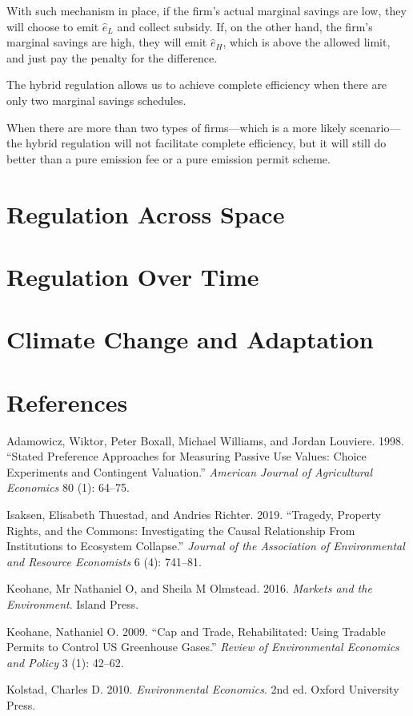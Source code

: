 \documentclass[
]{book}
\begin{document}
With such mechanism in place, if the firm's actual marginal savings are low, they will choose to emit \(\hat{e}_L\) and collect subsidy. If, on the other hand, the firm's marginal savings are high, they will emit \(\hat{e}_H\), which is above the allowed limit, and just pay the penalty for the difference.

The hybrid regulation allows us to achieve complete efficiency when there are only two marginal savings schedules.

When there are more than two types of firms---which is a more likely scenario---the hybrid regulation will not facilitate complete efficiency, but it will still do better than a pure emission fee or a pure emission permit scheme.

\hypertarget{regulation-across-space}{%
\chapter{Regulation Across Space}\label{regulation-across-space}}

\hypertarget{regulation-over-time}{%
\chapter{Regulation Over Time}\label{regulation-over-time}}

\hypertarget{climate-change-and-adaptation}{%
\chapter{Climate Change and Adaptation}\label{climate-change-and-adaptation}}

\hypertarget{references}{%
\chapter*{References}\label{references}}

\hypertarget{refs}{}
\leavevmode\hypertarget{ref-adamowicz1998}{}%
Adamowicz, Wiktor, Peter Boxall, Michael Williams, and Jordan Louviere. 1998. ``Stated Preference Approaches for Measuring Passive Use Values: Choice Experiments and Contingent Valuation.'' \emph{American Journal of Agricultural Economics} 80 (1): 64--75.

\leavevmode\hypertarget{ref-isaksen2019}{}%
Isaksen, Elisabeth Thuestad, and Andries Richter. 2019. ``Tragedy, Property Rights, and the Commons: Investigating the Causal Relationship From Institutions to Ecosystem Collapse.'' \emph{Journal of the Association of Environmental and Resource Economists} 6 (4): 741--81.

\leavevmode\hypertarget{ref-keohane2016}{}%
Keohane, Mr Nathaniel O, and Sheila M Olmstead. 2016. \emph{Markets and the Environment}. Island Press.

\leavevmode\hypertarget{ref-keohane2009}{}%
Keohane, Nathaniel O. 2009. ``Cap and Trade, Rehabilitated: Using Tradable Permits to Control US Greenhouse Gases.'' \emph{Review of Environmental Economics and Policy} 3 (1): 42--62.

\leavevmode\hypertarget{ref-kolstad2010}{}%
Kolstad, Charles D. 2010. \emph{Environmental Economics}. 2nd ed. Oxford University Press.
\end{document}
